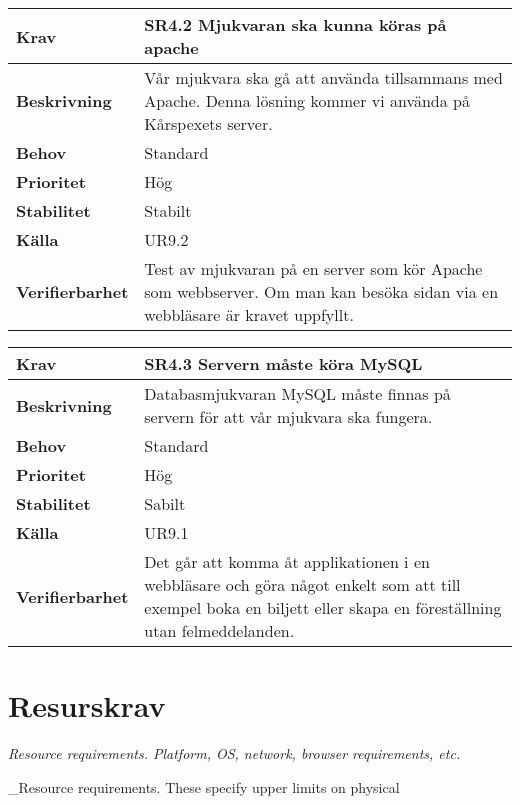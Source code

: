 \documentclass[a4paper, twoside, 11pt, titlepage]{article}
\begin{document}
\begin{tabular} { p{2.6cm} p{12.5cm} }
	\hline
	\sffamily\textbf{Krav} & \sffamily\textbf{SR4.2 Mjukvaran ska kunna köras på apache } \\
	\hline
	\sffamily\textbf{Beskrivning} & Vår mjukvara ska gå att använda tillsammans med Apache. Denna lösning kommer vi använda på Kårspexets server.  \\
	\hline
	\sffamily\textbf{Behov} & Standard  \\
	\hline
	\sffamily\textbf{Prioritet} & Hög  \\
	\hline
	\sffamily\textbf{Stabilitet} & Stabilt  \\
	\hline
	\sffamily\textbf{Källa} & UR9.2  \\
	\hline
	\sffamily\textbf{Verifierbarhet} & Test av mjukvaran på en server som kör Apache som webbserver. Om man kan besöka sidan via en webbläsare är kravet uppfyllt.  \\
	\hline
\end{tabular}
\vspace{6mm}

\begin{tabular} { p{2.6cm} p{12.5cm} }
	\hline
	\sffamily\textbf{Krav} & \sffamily\textbf{SR4.3 Servern måste köra MySQL } \\
	\hline
	\sffamily\textbf{Beskrivning} & Databasmjukvaran MySQL måste finnas på servern för att vår mjukvara ska fungera.  \\
	\hline
	\sffamily\textbf{Behov} & Standard  \\
	\hline
	\sffamily\textbf{Prioritet} & Hög  \\
	\hline
	\sffamily\textbf{Stabilitet} & Sabilt  \\
	\hline
	\sffamily\textbf{Källa} & UR9.1  \\
	\hline
	\sffamily\textbf{Verifierbarhet} & Det går att komma åt applikationen i en webbläsare och göra något enkelt som att till exempel boka en biljett eller skapa en föreställning utan felmeddelanden.  \\
	\hline
\end{tabular}


\clearpage
\section{Resurskrav}


\emph{Resource requirements. Platform, OS, network, browser requirements, etc.}

\_Resource requirements. These specify upper limits on physical
\end{document}

